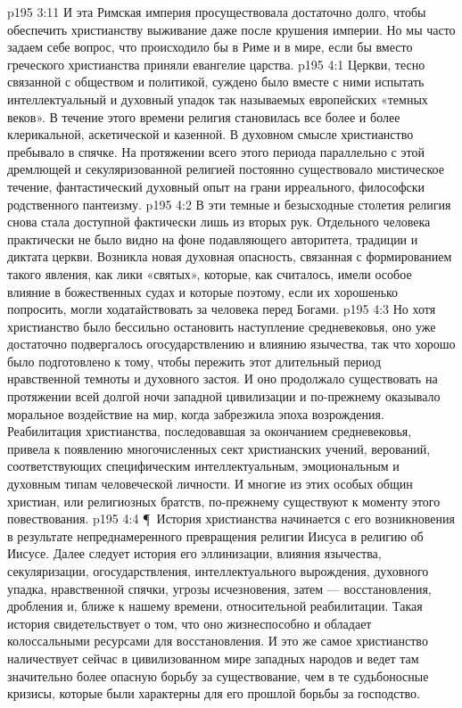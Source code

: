 \vs p195 3:11 И эта Римская империя просуществовала достаточно долго, чтобы обеспечить христианству выживание даже после крушения империи. Но мы часто задаем себе вопрос, что происходило бы в Риме и в мире, если бы вместо греческого христианства приняли евангелие царства.
\vs p195 4:1 Церкви, тесно связанной с обществом и политикой, суждено было вместе с ними испытать интеллектуальный и духовный упадок так называемых европейских «темных веков». В течение этого времени религия становилась все более и более клерикальной, аскетической и казенной. В духовном смысле христианство пребывало в спячке. На протяжении всего этого периода параллельно с этой дремлющей и секуляризованной религией постоянно существовало мистическое течение, фантастический духовный опыт на грани ирреального, философски родственного пантеизму.
\vs p195 4:2 В эти темные и безысходные столетия религия снова стала доступной фактически лишь из вторых рук. Отдельного человека практически не было видно на фоне подавляющего авторитета, традиции и диктата церкви. Возникла новая духовная опасность, связанная с формированием такого явления, как лики «святых», которые, как считалось, имели особое влияние в божественных судах и которые поэтому, если их хорошенько попросить, могли ходатайствовать за человека перед Богами.
\vs p195 4:3 Но хотя христианство было бессильно остановить наступление средневековья, оно уже достаточно подвергалось огосударствлению и влиянию язычества, так что хорошо было подготовлено к тому, чтобы пережить этот длительный период нравственной темноты и духовного застоя. И оно продолжало существовать на протяжении всей долгой ночи западной цивилизации и по\hyp{}прежнему оказывало моральное воздействие на мир, когда забрезжила эпоха возрождения. Реабилитация христианства, последовавшая за окончанием средневековья, привела к появлению многочисленных сект христианских учений, верований, соответствующих специфическим интеллектуальным, эмоциональным и духовным типам человеческой личности. И многие из этих особых общин христиан, или религиозных братств, по\hyp{}прежнему существуют к моменту этого повествования.
\vs p195 4:4 \P\ История христианства начинается с его возникновения в результате непреднамеренного превращения религии Иисуса в религию об Иисусе. Далее следует история его эллинизации, влияния язычества, секуляризации, огосударствления, интеллектуального вырождения, духовного упадка, нравственной спячки, угрозы исчезновения, затем --- восстановления, дробления и, ближе к нашему времени, относительной реабилитации. Такая история свидетельствует о том, что оно жизнеспособно и обладает колоссальными ресурсами для восстановления. И это же самое христианство наличествует сейчас в цивилизованном мире западных народов и ведет там значительно более опасную борьбу за существование, чем в те судьбоносные кризисы, которые были характерны для его прошлой борьбы за господство.
